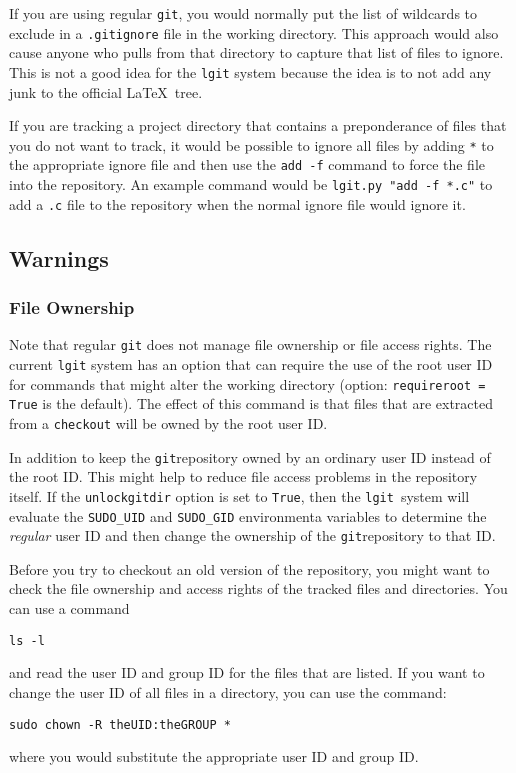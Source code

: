 \documentclass{ltxdoc}
\def\ucmd#1{{\tt {#1}}}
\def\lgit{{\tt lgit}}
\begin{document}
If you are using regular \ucmd{git}, you would normally put the list of wildcards to exclude in a \ucmd{.gitignore} file in the working directory. This approach would also cause anyone who pulls from that directory to capture that list of files to ignore.  This is not a good idea for the \ucmd{lgit} system because the idea is to not add any junk to the official \LaTeX\ tree.


If you are tracking a project directory that contains a preponderance of files that you do not want to track, it would be possible to ignore all files by adding \ucmd{*}  to the appropriate ignore file and then use the \ucmd{add -f} command to force the file into the repository.  An example command would be \ucmd{lgit.py "add -f *.c"} to add a \ucmd{.c} file to the repository when the normal ignore file would ignore it.

\subsection{Warnings}\label{warnings}
\subsubsection{File Ownership}
Note that regular \ucmd{git} does not manage file ownership or file access rights. The current \ucmd{lgit} system has an option that can require the use of the root user ID for commands that might alter the working directory (option: \ucmd{requireroot = True} is the default).  The effect of this command is that files that are extracted from a \ucmd{checkout} will be owned by the root user ID.

In addition to keep the \ucmd{git}repository owned by an ordinary user ID instead of the root ID. This might help to reduce file access problems in the repository itself. If the \ucmd{unlockgitdir} option is set to \ucmd{True}, then the \lgit\ system will evaluate the \ucmd{SUDO\_UID} and \ucmd{SUDO\_GID} environmenta variables to determine the \emph{regular} user ID and then change the ownership of the \ucmd{git}repository to that ID.

Before you try to checkout an old version of the repository, you might want to check the file ownership and access rights of the tracked files and directories.  You can use a command
\begin{verbatim}
ls -l
\end{verbatim}
and read the user ID and group ID for the files that are listed.  If you want to change the user ID of all files in a directory, you can use the command:
\begin{verbatim}
sudo chown -R theUID:theGROUP *
\end{verbatim}
where you would substitute the appropriate user ID and group ID.
\end{document}
